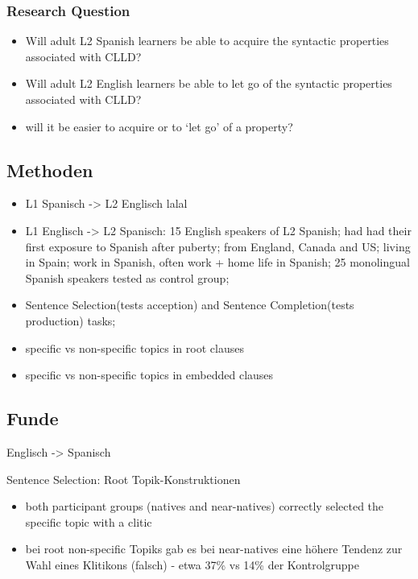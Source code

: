 \subsubsection{Research Question}
\begin{itemize}
    \item Will adult L2 Spanish learners be able to acquire the syntactic properties associated with CLLD?
    \item Will adult L2 English learners be able to let go of the syntactic properties associated with CLLD?
    \item will it be easier to acquire or to ‘let go’ of a property?
\end{itemize}

\subsection{Methoden}

\begin{itemize}
    \item L1 Spanisch -> L2 Englisch lalal
    \item L1 Englisch -> L2 Spanisch: 15 English speakers of L2 Spanish; had had their first exposure to Spanish after puberty;
        from England, Canada and US; living in Spain; work in Spanish, often work + home life in Spanish;
        25 monolingual Spanish speakers tested as control group;
    \item Sentence Selection(tests acception) and Sentence Completion(tests production) tasks;
    \item specific vs non-specific topics in root clauses
    \item specific vs non-specific topics in embedded clauses
\end{itemize}

\subsection{Funde}

Englisch -> Spanisch

Sentence Selection: Root Topik-Konstruktionen
\begin{itemize}
    \item both participant groups (natives and near-natives) correctly selected the specific topic with a clitic
    \item bei root non-specific Topiks gab es bei near-natives eine höhere Tendenz zur Wahl eines Klitikons (falsch) - etwa 37\% vs 14\% der Kontrolgruppe
\end{itemize}

